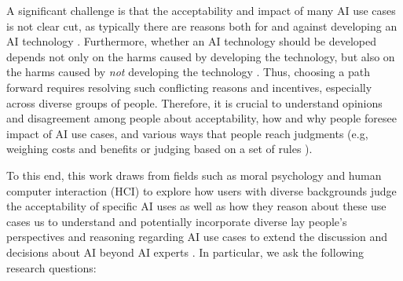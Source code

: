 A significant challenge is that the acceptability and impact of many AI use cases is not clear cut, as typically there are reasons both for and against developing an AI technology \citep{}. Furthermore, whether an AI technology should be developed depends not only on the harms caused by developing the technology, but also on the harms caused by \emph{not} developing the technology \citep{mun2024participaidemocraticsurveyingframework}. Thus, choosing a path forward requires resolving such conflicting reasons and incentives, especially across diverse groups of people. Therefore, it is crucial to understand opinions and disagreement among people about acceptability, how and why people foresee impact of AI use cases, and various ways that people reach judgments (e.g, weighing costs and benefits or judging based on a set of rules \citep{}).


To this end, this work draws from fields such as moral psychology and human computer interaction (HCI) to explore how users with diverse backgrounds judge the acceptability of specific AI uses as well as how they reason about these use cases us to understand and potentially incorporate diverse lay people's perspectives and reasoning regarding AI use cases to extend the discussion and decisions about AI beyond AI experts \citep{}. In particular, we ask the following research questions:

